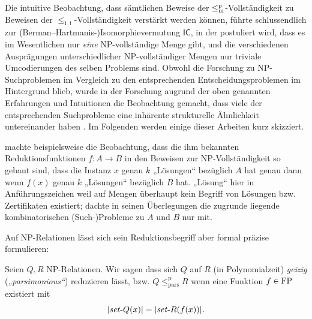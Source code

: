 Die intuitive Beobachtung, dass sämtlichen Beweise der $\leq_\mathrm{m}^\mathrm{p}$-Vollständigkeit zu Beweisen der $\leq_\mathrm{1,i}$-Vollständigkeit verstärkt werden können, führte schlussendlich zur (Berman--Hartmanis-)Isomorphievermutung $\mathsf{IC}$, in der postuliert wird, dass es im Wesentlichen nur \emph{eine} NP-vollständige Menge gibt, und die verschiedenen Ausprägungen unterschiedlicher NP-vollständiger Mengen nur triviale Umcodierungen des selben Problems sind.
Obwohl die Forschung zu NP-Suchproblemen im Vergleich zu den entsprechenden Entscheidungsproblemen im Hintergrund blieb, wurde in der Forschung augrund der oben genannten Erfahrungen und Intuitionen die Beobachtung gemacht, dass viele der entsprechenden Suchprobleme eine inhärente strukturelle Ähnlichkeit untereinander haben \parencite[vgl. auch die Diskussion von][]{hemaspaandra_take-home_1998}.
Im Folgenden werden einige dieser Arbeiten kurz skizziert.

\textcite[83]{simon_central_1975} machte beispielsweise die Beobachtung, dass die ihm bekannten Reduktionsfunktionen $f\colon A\to B$ in den Beweisen zur NP-Vollständigkeit so gebaut sind, dass die Instanz $x$ genau $k$ „Lösungen“ bezüglich $A$ hat genau dann wenn $f(x)$ genau $k$ „Lösungen“ bezüglich $B$ hat. „Lösung“ hier in Anführungszeichen weil auf Mengen überhaupt kein Begriff von Lösungen bzw. Zertifikaten existiert; \citeauthor{simon_central_1975} dachte in seinen Überlegungen die zugrunde liegende kombinatorischen (Such-)Probleme zu $A$ und $B$ nur mit.

Auf NP-Relationen lässt sich sein Reduktionsbegriff aber formal präzise formulieren:
\begin{definition}
    Seien $Q, R$ NP-Relationen. Wir sagen dass sich $Q$ auf $R$ (in Polynomialzeit) \emph{geizig} (\emph{„parsimonious“}) reduzieren lässt, bzw. $Q\leq_\mathrm{pars}^\mathrm p R$ wenn eine Funktion $f\in\mathrm{FP}$ existiert mit%
    \[ |\mathit{set}\text{-}{}Q(x)|=|\mathit{set}\text{-}{}R(f(x))|. \]
\end{definition}

